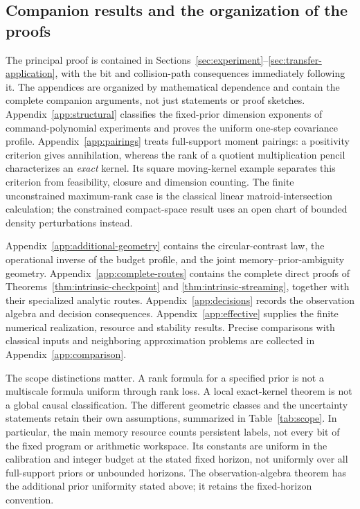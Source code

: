 \documentclass[11pt]{amsart}
\theoremstyle{definition}\newtheorem{definition}[theorem]{Definition}
\theoremstyle{remark}\newtheorem{remark}[theorem]{Remark}
\begin{document}
\subsection{Companion results and the organization of the proofs}
The principal proof is contained in Sections~\ref{sec:experiment}--\ref{sec:transfer-application},
with the bit and collision-path consequences immediately following it.
The appendices are organized by mathematical dependence and contain the
complete companion arguments, not just statements or proof sketches.
Appendix~\ref{app:structural} classifies the fixed-prior dimension
exponents of command-polynomial experiments and proves the uniform
one-step covariance profile. Appendix~\ref{app:pairings} treats
full-support moment pairings: a positivity criterion gives annihilation,
whereas the rank of a quotient multiplication pencil characterizes an
\emph{exact} kernel. Its square moving-kernel example separates this
criterion from feasibility, closure and dimension counting. The finite
unconstrained maximum-rank case is the classical linear
matroid-intersection calculation; the constrained compact-space result
uses an open chart of bounded density perturbations instead.

Appendix~\ref{app:additional-geometry} contains the circular-contrast
law, the operational inverse of the budget profile, and the joint
memory--prior-ambiguity geometry. Appendix~\ref{app:complete-routes}
contains the complete direct proofs of
Theorems~\ref{thm:intrinsic-checkpoint} and
\ref{thm:intrinsic-streaming}, together with their specialized analytic routes.
Appendix~\ref{app:decisions} records the observation algebra and decision
consequences. Appendix~\ref{app:effective} supplies the finite numerical
realization, resource and stability results. Precise comparisons with
classical inputs and neighboring approximation problems are collected
in Appendix~\ref{app:comparison}.

The scope distinctions matter. A rank formula for a specified prior
is not a multiscale formula uniform through rank loss. A local
exact-kernel theorem is not a global causal classification. The
different geometric classes and the uncertainty statements retain their
own assumptions, summarized in Table~\ref{tab:scope}. In particular,
the main memory resource counts persistent labels, not every bit of
the fixed program or arithmetic workspace. Its constants are uniform
in the calibration and integer budget at the stated fixed horizon,
not uniformly over all full-support priors or unbounded horizons.
The observation-algebra theorem has the additional prior uniformity
stated above; it retains the fixed-horizon convention.
\end{document}
